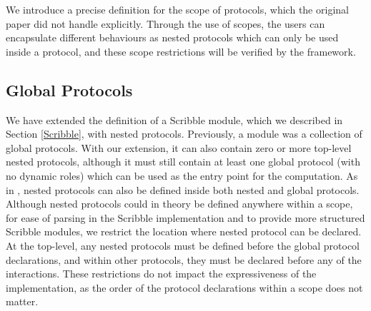 \documentclass[12pt,twoside]{report}
\begin{document}
We introduce a precise definition for the scope of protocols, which the original paper\cite{nestedprotocols} did not handle explicitly. Through the use of scopes, the users can encapsulate different behaviours as nested protocols which can only be used inside a protocol, and these scope restrictions will be verified by the framework.\\

\subsection{Global Protocols}\label{scr-global-protocols}

We have extended the definition of a Scribble module, which we described in Section \ref{Scribble}, with nested protocols. Previously, a module was a collection of global protocols. With our extension, it can also contain zero or more top-level nested protocols, although it must still contain at least one global protocol (with no dynamic roles) which can be used as the entry point for the computation. As in \cite{nestedprotocols}, nested protocols can also be defined inside both nested and global protocols.\\

Although nested protocols could in theory be defined anywhere within a scope, for ease of parsing in the Scribble implementation and to provide more structured Scribble modules, we restrict the location where nested protocol can be declared. At the top-level, any nested protocols must be defined before the global protocol declarations, and within other protocols, they must be declared before any of the interactions. These restrictions do not impact the expressiveness of the implementation, as the order of the protocol declarations within a scope does not matter.\\
\end{document}
